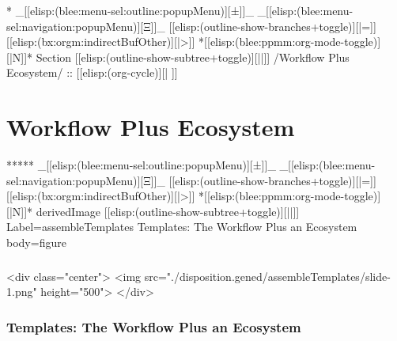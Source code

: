 \begin{whenOrg}
\begin{whenOrg}
*  _[[elisp:(blee:menu-sel:outline:popupMenu)][±]]_ _[[elisp:(blee:menu-sel:navigation:popupMenu)][Ξ]]_ [[elisp:(outline-show-branches+toggle)][|=]] [[elisp:(bx:orgm:indirectBufOther)][|>]] *[[elisp:(blee:ppmm:org-mode-toggle)][|N]]*  Section    [[elisp:(outline-show-subtree+toggle)][||]]   /Workflow Plus Ecosystem/ ::  [[elisp:(org-cycle)][| ]]
\end{whenOrg}

\section{Workflow Plus Ecosystem}

\begin{whenOrg}
*****  _[[elisp:(blee:menu-sel:outline:popupMenu)][±]]_ _[[elisp:(blee:menu-sel:navigation:popupMenu)][Ξ]]_ [[elisp:(outline-show-branches+toggle)][|=]] [[elisp:(bx:orgm:indirectBufOther)][|>]] *[[elisp:(blee:ppmm:org-mode-toggle)][|N]]*  derivedImage [[elisp:(outline-show-subtree+toggle)][||]] Label=assembleTemplates Templates: The Workflow Plus an Ecosystem body=figure
\end{whenOrg}

\begin{htmlonly}

\begin{frame}[fragile,plain,label=assembleTemplates]
    \frametitle{}
    \framesubtitle{}
    \begin{rawhtml}
<div class="center">
<img src="./disposition.gened/assembleTemplates/slide-1.png" height="500">
</div>
    \end{rawhtml}
\end{frame}
\end{htmlonly}

\begin{verblatex}

\begin{frame}[fragile,plain,label=assembleTemplates]
    \frametitle{Templates: The Workflow Plus an Ecosystem}
    \framesubtitle{}


\end{frame}
\end{verblatex}
\end{whenOrg}
